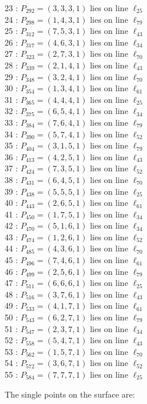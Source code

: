 \documentclass{article}
\begin{document}
{\begin{multicols}{2}
23 : $P_{292}=( 3, 3, 3, 1 )$ lies on line $\ell_{25}$\\
24 : $P_{298}=( 1, 4, 3, 1 )$ lies on line $\ell_{79}$\\
25 : $P_{312}=( 7, 5, 3, 1 )$ lies on line $\ell_{43}$\\
26 : $P_{317}=( 4, 6, 3, 1 )$ lies on line $\ell_{34}$\\
27 : $P_{323}=( 2, 7, 3, 1 )$ lies on line $\ell_{70}$\\
28 : $P_{339}=( 2, 1, 4, 1 )$ lies on line $\ell_{43}$\\
29 : $P_{348}=( 3, 2, 4, 1 )$ lies on line $\ell_{70}$\\
30 : $P_{354}=( 1, 3, 4, 1 )$ lies on line $\ell_{61}$\\
31 : $P_{365}=( 4, 4, 4, 1 )$ lies on line $\ell_{25}$\\
32 : $P_{375}=( 6, 5, 4, 1 )$ lies on line $\ell_{34}$\\
33 : $P_{384}=( 7, 6, 4, 1 )$ lies on line $\ell_{79}$\\
34 : $P_{390}=( 5, 7, 4, 1 )$ lies on line $\ell_{52}$\\
35 : $P_{404}=( 3, 1, 5, 1 )$ lies on line $\ell_{79}$\\
36 : $P_{413}=( 4, 2, 5, 1 )$ lies on line $\ell_{43}$\\
37 : $P_{424}=( 7, 3, 5, 1 )$ lies on line $\ell_{52}$\\
38 : $P_{431}=( 6, 4, 5, 1 )$ lies on line $\ell_{70}$\\
39 : $P_{438}=( 5, 5, 5, 1 )$ lies on line $\ell_{25}$\\
40 : $P_{443}=( 2, 6, 5, 1 )$ lies on line $\ell_{61}$\\
41 : $P_{450}=( 1, 7, 5, 1 )$ lies on line $\ell_{34}$\\
42 : $P_{470}=( 5, 1, 6, 1 )$ lies on line $\ell_{34}$\\
43 : $P_{474}=( 1, 2, 6, 1 )$ lies on line $\ell_{52}$\\
44 : $P_{485}=( 4, 3, 6, 1 )$ lies on line $\ell_{70}$\\
45 : $P_{496}=( 7, 4, 6, 1 )$ lies on line $\ell_{61}$\\
46 : $P_{499}=( 2, 5, 6, 1 )$ lies on line $\ell_{79}$\\
47 : $P_{511}=( 6, 6, 6, 1 )$ lies on line $\ell_{25}$\\
48 : $P_{516}=( 3, 7, 6, 1 )$ lies on line $\ell_{43}$\\
49 : $P_{533}=( 4, 1, 7, 1 )$ lies on line $\ell_{61}$\\
50 : $P_{543}=( 6, 2, 7, 1 )$ lies on line $\ell_{79}$\\
51 : $P_{547}=( 2, 3, 7, 1 )$ lies on line $\ell_{34}$\\
52 : $P_{558}=( 5, 4, 7, 1 )$ lies on line $\ell_{43}$\\
53 : $P_{562}=( 1, 5, 7, 1 )$ lies on line $\ell_{70}$\\
54 : $P_{572}=( 3, 6, 7, 1 )$ lies on line $\ell_{52}$\\
55 : $P_{584}=( 7, 7, 7, 1 )$ lies on line $\ell_{25}$\\
\end{multicols}
The single points on the surface are:\\
}
\end{document}
